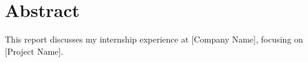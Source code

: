 \chapter*{Abstract}
This report discusses my internship experience at [Company Name], focusing on [Project Name].

\pagebreak
